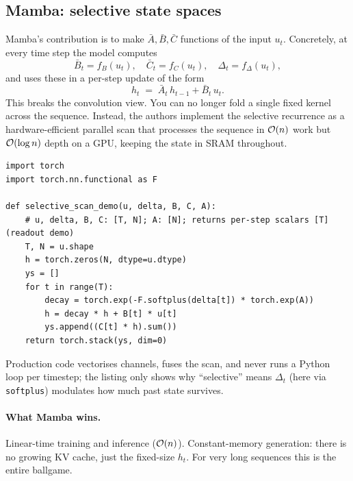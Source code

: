 \subsection{Mamba: selective state spaces}

Mamba's contribution is to make \(\bar A, \bar B, \bar C\) functions of
the input \(u_t\). Concretely, at every time step the model computes
\begin{equation}
  \bar B_t = f_B(u_t), \quad
  \bar C_t = f_C(u_t), \quad
  \Delta_t = f_\Delta(u_t),
\end{equation}
and uses these in a per-step update of the form
\begin{equation}
  h_t \;=\; \bar A_t\, h_{t-1} + \bar B_t\, u_t.
\end{equation}
This breaks the convolution view. You can no longer fold a single fixed
kernel across the sequence. Instead, the authors implement the
selective recurrence as a hardware-efficient parallel scan that processes
the sequence in $\mathcal{O}(n)$ work but $\mathcal{O}(\log n)$ depth on a GPU,
keeping the state in SRAM throughout.

\begin{lstlisting}[caption={Selective scan \emph{shape} (sequential Python). Real Mamba fuses this into a parallel associative scan on GPU \citep{gu2023mamba}.}]
import torch
import torch.nn.functional as F

def selective_scan_demo(u, delta, B, C, A):
    # u, delta, B, C: [T, N]; A: [N]; returns per-step scalars [T] (readout demo)
    T, N = u.shape
    h = torch.zeros(N, dtype=u.dtype)
    ys = []
    for t in range(T):
        decay = torch.exp(-F.softplus(delta[t]) * torch.exp(A))
        h = decay * h + B[t] * u[t]
        ys.append((C[t] * h).sum())
    return torch.stack(ys, dim=0)
\end{lstlisting}

\noindent
Production code vectorises channels, fuses the scan, and never runs a
Python loop per timestep; the listing only shows why ``selective'' means
\(\Delta_t\) (here via \texttt{softplus}) modulates how much past state
survives.

\paragraph{What Mamba wins.} Linear-time training and inference
($\mathcal{O}(n)$). Constant-memory generation: there is no growing KV cache,
just the fixed-size \(h_t\). For very long sequences this is the entire
ballgame.

